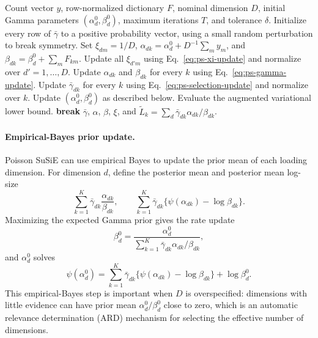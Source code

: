\documentclass[11pt]{article}
\theoremstyle{plain}
\theoremstyle{definition}
\begin{document}
\begin{algorithm}[t]
\caption{Poisson SuSiE with a fixed dictionary}
\label{alg:poisson-susie}
\small
\begin{algorithmic}[1]
\Require Count vector $y$, row-normalized dictionary $F$, nominal dimension
$D$, initial Gamma parameters $(\alpha_d^0,\beta_d^0)$, maximum iterations
$T$, and tolerance $\delta$.
\State Initialize every row of $\bar\gamma$ to a positive probability vector,
using a small random perturbation to break symmetry.
\State Set $\xi_{dm}=1/D$,
$\alpha_{dk}=\alpha_d^0+D^{-1}\sum_m y_m$, and
$\beta_{dk}=\beta_d^0+\sum_mF_{km}$.
    \State Update all $\xi_{d'm}$ using Eq.~\eqref{eq:ps-xi-update} and
    normalize over $d'=1,\ldots,D$.
    \State Update $\alpha_{dk}$ and $\beta_{dk}$ for every $k$ using
    Eq.~\eqref{eq:ps-gamma-update}.
    \State Update $\bar\gamma_{dk}$ for every $k$ using
    Eq.~\eqref{eq:ps-selection-update} and normalize over $k$.
      \State Update $(\alpha_d^0,\beta_d^0)$ as described below.
    \EndIf
  \EndFor
  \State Evaluate the augmented variational lower bound.
    \State \textbf{break}
  \EndIf
\EndFor
\State \Return $\bar\gamma$, $\alpha$, $\beta$, $\xi$, and
$\widetilde L_k=\sum_d\bar\gamma_{dk}\alpha_{dk}/\beta_{dk}$.
\end{algorithmic}
\end{algorithm}

\paragraph{Empirical-Bayes prior update.}

Poisson SuSiE can use empirical Bayes to update the prior mean of each loading
dimension. For dimension $d$, define the posterior mean and posterior mean
log-size
\[
  \sum_{k=1}^K \bar{\gamma}_{dk}\frac{\alpha_{dk}}{\beta_{dk}},
  \qquad
  \sum_{k=1}^K
  \bar{\gamma}_{dk}\{\psi(\alpha_{dk})-\log\beta_{dk}\}.
\]
Maximizing the expected Gamma prior gives the rate update
\[
  \beta_d^0
  =
  \frac{\alpha_d^0}
       {\sum_{k=1}^K \bar{\gamma}_{dk}\alpha_{dk}/\beta_{dk}},
\]
and $\alpha_d^0$ solves
\[
  \psi(\alpha_d^0)
  =
  \sum_{k=1}^K
  \bar{\gamma}_{dk}\{\psi(\alpha_{dk})-\log\beta_{dk}\}
  + \log\beta_d^0.
\]
This empirical-Bayes step is important when $D$ is overspecified: dimensions with
little evidence can have prior mean $\alpha_d^0/\beta_d^0$ close to zero,
which is an automatic relevance determination (ARD) mechanism for selecting the
effective number of dimensions.
\end{document}
